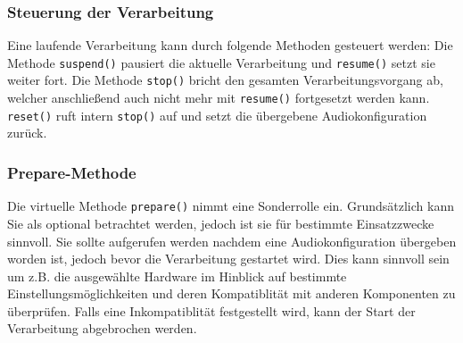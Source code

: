 \subsubsection{Steuerung der Verarbeitung}
Eine laufende Verarbeitung kann durch folgende Methoden gesteuert werden: Die Methode \texttt{suspend()} pausiert die aktuelle Verarbeitung und \texttt{resume()} setzt sie weiter fort. Die Methode \texttt{stop()} bricht den gesamten Verarbeitungsvorgang ab, welcher anschließend auch nicht mehr mit \texttt{resume()} fortgesetzt werden kann. \texttt{reset()} ruft intern \texttt{stop()} auf und setzt die übergebene Audiokonfiguration zurück.

\subsubsection{Prepare-Methode}
Die virtuelle Methode \texttt{prepare()} nimmt eine Sonderrolle ein. Grundsätzlich kann Sie als optional betrachtet werden, jedoch ist sie für bestimmte Einsatzzwecke sinnvoll. Sie sollte aufgerufen werden nachdem eine Audiokonfiguration übergeben worden ist, jedoch bevor die Verarbeitung gestartet wird. Dies kann sinnvoll sein um z.B. die ausgewählte Hardware im Hinblick auf bestimmte Einstellungsmöglichkeiten und deren Kompatiblität mit anderen Komponenten zu überprüfen. Falls eine Inkompatiblität festgestellt wird, kann der Start der Verarbeitung abgebrochen werden.

\FloatBarrier
